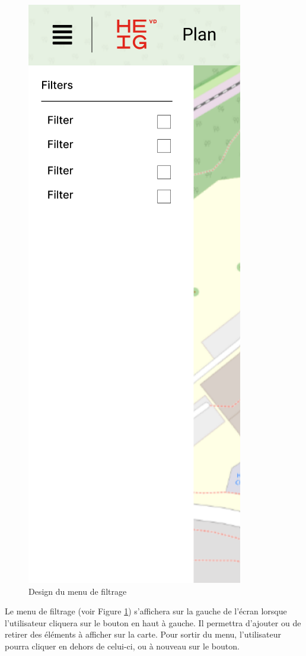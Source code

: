 \documentclass[
    iai, %
    il, %
]{heig-tb}
\begin{document}
\begin{figure}[h]
    \centering
    \includegraphics[scale=0.5]{designFilter.png}
    \caption{Design du menu de filtrage}
    \label{fig:filterPanel}
\end{figure}

Le menu de filtrage (voir Figure \ref{fig:filterPanel}) s'affichera sur la gauche de l'écran lorsque l'utilisateur cliquera sur le bouton en haut à gauche.
Il permettra d'ajouter ou de retirer des éléments à afficher sur la carte.
Pour sortir du menu, l'utilisateur pourra cliquer en dehors de celui-ci, ou à nouveau sur le bouton.
\end{document}
